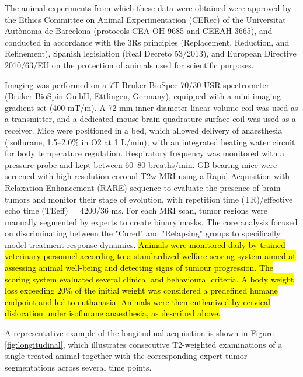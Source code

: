\documentclass{article}
\begin{document}
The animal experiments from which these data were obtained were approved by the Ethics Committee on Animal Experimentation (CERec) of the Universitat Autòno\-ma de Barcelona (protocols CEA-OH-9685 and CEEAH-3665), and conducted in accordance with the 3Rs principles (Replacement, Reduction, and Refinement), Spanish legislation (Real Decreto 53/2013), and European Directive 2010/63/EU on the protection of animals used for scientific purposes.

Imaging was performed on a 7T Bruker BioSpec 70/30 USR spectrometer (Bruker BioSpin GmbH, Ettlingen, Germany), equipped with a mini-imaging gradient set (400 mT/m). A 72-mm inner-diameter linear volume coil was used as a transmitter, and a dedicated mouse brain quadrature surface coil was used as a receiver. Mice were positioned in a bed, which allowed delivery of anaesthesia (isoflurane, 1.5–2.0\% in O2 at 1 L/min), with an integrated heating water circuit for body temperature regulation. Respiratory frequency was monitored with a pressure probe and kept between 60–80 breaths/min. GB-bearing mice were screened with high-resolution coronal T2w MRI using a Rapid Acquisition with Relaxation Enhancement (RARE) sequence to evaluate the presence of brain tumors and monitor their stage of evolution, with repetition time (TR)/effective echo time (TEeff) = 4200/36 ms. For each MRI scan, tumor regions were manually segmented by experts to create binary masks. The core analysis focused on discriminating between the "Cured" and "Relapsing" groups to specifically model treatment-response dynamics. {\color{black}\hl{Animals were monitored daily by trained veterinary personnel according to a standardized welfare scoring system aimed at assessing animal well-being and detecting signs of tumour progression. The scoring system evaluated several clinical and behavioural criteria. A body weight loss exceeding 20\% of the initial weight was considered a predefined humane endpoint and led to euthanasia. Animals were then euthanized by cervical dislocation under isoflurane anaesthesia, as described above.}} 

A representative example of the longitudinal acquisition is shown in Figure \ref{fig:longitudinal}, which illustrates consecutive T2-weighted examinations of a single treated animal together with the corresponding expert tumor segmentations across several time points.
\end{document}
